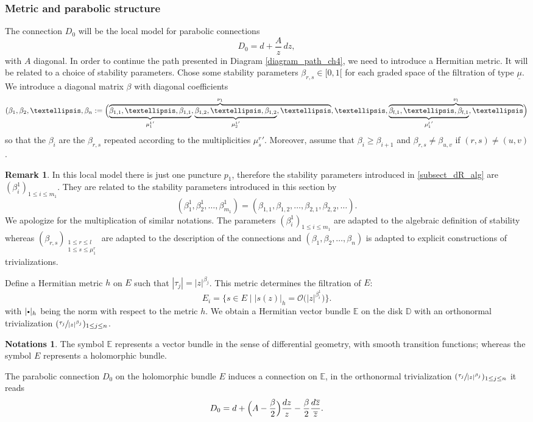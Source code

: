 \documentclass[11pt]{article}
\newcommand{\sbullet}{{\scriptscriptstyle\bullet}}
\newcommand{\csbullet}{{\raisebox{1pt}{$\sbullet$}}}
\theoremstyle{definition}
\newtheorem{remark}[definition]{Remark}
\newtheorem{notations}[definition]{Notations}
\theoremstyle{plain}
\begin{document}
\subsubsection{Metric and parabolic structure}
The connection $D_0$ will be the local model for parabolic connections
\[
D_0 = d + \frac{A}{z}\, dz,
\]
with $A$ diagonal. In order to continue the path presented in Diagram \eqref{diagram_path_ch4}, we need to introduce a Hermitian metric. It will be related to a choice of stability parameters. Chose some stability parameters $\beta_{r,s}\in [0,1[$ for each graded space of the filtration of type $\underline{\mu}$. We introduce a diagonal matrix $\beta$ with diagonal coefficients
\[
(\beta_1,\beta_2,\dots,\beta_n := \Bigl(\overbrace{\underbrace{\beta_{1,1},\dots,\beta_{1,1}}_{{\mu^1_1}'},\underbrace{\beta_{1,2},\dots,\beta_{1,2}}_{{\mu^1_2}'},\dots}^{\nu_1},\dots,\overbrace{\underbrace{\beta_{l,1},\dots,\beta_{l,1}}_{{\mu^l_1}'},\dots }^{\nu_l} \Bigr)
\]
so that the $\beta_i$ are the $\beta_{r,s}$ repeated according to the multiplicities ${\mu^r_s}'$. Moreover, assume that $\beta_i \ge \beta_{i+1}$ and $\beta_{r,s}\ne \beta_{u,v}$ if $(r,s)\ne(u,v)$.
\begin{remark}\label{remark_various_beta}
In this local model there is just one puncture $p_1$, therefore the stability parameters introduced in \ref{subsect_dR_alg} are $(\beta^1_i)_{1\le i \le m_1}$. They are related to the stability parameters introduced in this section by
\[
(\beta^1_1,\beta^1_2,\dots,\beta^1_{m_1})=(\beta_{1,1},\beta_{1,2},\dots,\beta_{2,1},\beta_{2,2},\dots).
\]
We apologize for the multiplication of similar notations. The parameters $(\beta^1_i)_{1\le i \le m_1}$ are adapted to the algebraic definition of stability whereas $(\beta_{r,s})_{\substack{1\le r \le l \\ 1 \le s \le \mu^r_1 }}$ are adapted to the description of the connections and $(\beta_1,\beta_2,\dots,\beta_n)$ is adapted to explicit constructions of trivializations.
\end{remark}
Define a Hermitian metric $h$ on $E$ such that $|\tau_j| = |z|^{\beta_j}$. This metric determines the filtration of $E$:
\[
E_i = \bigl\lbrace s\in E \mid | s(z) |_h = \mathcal{O}\bigl(| z|^{\beta^1_i}\bigr)\bigr\rbrace.
\]
with $|\csbullet|_h$ being the norm with respect to the metric $h$. We obtain a Hermitian vector bundle $\mathbb{E}$ on the disk $\mathbb{D}$ with an orthonormal trivialization $(\sfrac{\tau_j}{|z|^{\beta_j}})_{1\le j \le n}$.
\begin{notations}
The symbol $\mathbb{E}$ represents a vector bundle in the sense of differential geometry, with smooth transition functions; whereas the symbol $E$ represents a holomorphic bundle.
\end{notations}
The parabolic connection $D_0$ on the holomorphic bundle $E$ induces a connection on $\mathbb{E}$, in the orthonormal trivialization $(\sfrac{\tau_j}{|z|^{\beta_j}})_{1\le j \le n}$ it reads
\[
D_0 = d + \Bigl(A -\frac{\beta}{2}\Bigr) \frac{d z}{z} -\frac{\beta}{2} \frac{d \overline{z}}{\overline{z}}.
\]
\end{document}
